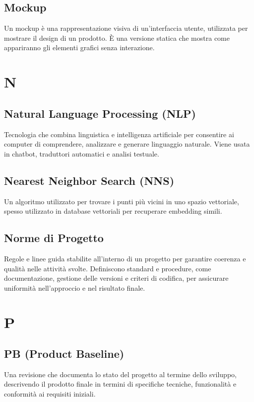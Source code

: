 \documentclass{article}
\begin{document}
\subsection{Mockup}
Un mockup è una rappresentazione visiva di un'interfaccia utente, utilizzata per mostrare il design di un prodotto. È una versione statica che mostra come appariranno gli elementi grafici senza interazione.

\newpage

\section{N}

\subsection{Natural Language Processing (NLP)}
Tecnologia che combina linguistica e intelligenza artificiale per consentire ai computer di comprendere, analizzare e generare linguaggio naturale. Viene usata in chatbot, traduttori automatici e analisi testuale.

\subsection{Nearest Neighbor Search (NNS)}
Un algoritmo utilizzato per trovare i punti più vicini in uno spazio vettoriale, spesso utilizzato in database vettoriali per recuperare embedding simili.

\subsection{Norme di Progetto}
Regole e linee guida stabilite all'interno di un progetto per garantire coerenza e qualità nelle attività svolte. Definiscono standard e procedure, come documentazione, gestione delle versioni e criteri di codifica, per assicurare uniformità nell'approccio e nel risultato finale.

\newpage

\section{P}

\subsection{PB (Product Baseline)}
Una revisione che documenta lo stato del progetto al termine dello sviluppo, descrivendo il prodotto finale in termini di specifiche tecniche, funzionalità e conformità ai requisiti iniziali.
\end{document}
